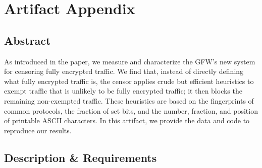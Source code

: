 %

\appendix
\section{Artifact Appendix}


\subsection{Abstract}

As introduced in the paper, we measure and characterize the GFW's new
system for censoring fully encrypted traffic. We find that, 
instead of directly defining what fully encrypted traffic is, the
censor applies crude but efficient heuristics to exempt traffic
that is unlikely to be fully encrypted traffic; it then blocks the
remaining non-exempted traffic. These heuristics are based
on the fingerprints of common protocols, the fraction of set
bits, and the number, fraction, and position of printable ASCII
characters. 
In this artifact,
we provide the data and code to reproduce our results.

\subsection{Description \& Requirements}

